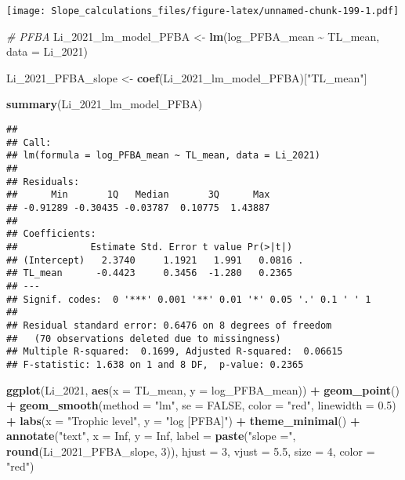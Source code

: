 \documentclass[
]{article}
\newenvironment{Shaded}{\begin{snugshade}}{\end{snugshade}}
\newcommand{\AttributeTok}[1]{\textcolor[rgb]{0.13,0.29,0.53}{#1}}
\newcommand{\CommentTok}[1]{\textcolor[rgb]{0.56,0.35,0.01}{\textit{#1}}}
\newcommand{\ConstantTok}[1]{\textcolor[rgb]{0.56,0.35,0.01}{#1}}
\newcommand{\DecValTok}[1]{\textcolor[rgb]{0.00,0.00,0.81}{#1}}
\newcommand{\FloatTok}[1]{\textcolor[rgb]{0.00,0.00,0.81}{#1}}
\newcommand{\FunctionTok}[1]{\textcolor[rgb]{0.13,0.29,0.53}{\textbf{#1}}}
\newcommand{\NormalTok}[1]{#1}
\newcommand{\OtherTok}[1]{\textcolor[rgb]{0.56,0.35,0.01}{#1}}
\newcommand{\SpecialCharTok}[1]{\textcolor[rgb]{0.81,0.36,0.00}{\textbf{#1}}}
\newcommand{\StringTok}[1]{\textcolor[rgb]{0.31,0.60,0.02}{#1}}
\begin{document}
\texttt{[image: Slope\_calculations\_files/figure-latex/unnamed-chunk-199-1.pdf]}

\begin{Shaded}
\begin{Highlighting}[]
\CommentTok{\# PFBA}
\NormalTok{Li\_2021\_lm\_model\_PFBA }\OtherTok{\textless{}{-}} \FunctionTok{lm}\NormalTok{(log\_PFBA\_mean }\SpecialCharTok{\textasciitilde{}}\NormalTok{ TL\_mean,}
                                    \AttributeTok{data =}\NormalTok{ Li\_2021)}

\NormalTok{Li\_2021\_PFBA\_slope }\OtherTok{\textless{}{-}} \FunctionTok{coef}\NormalTok{(Li\_2021\_lm\_model\_PFBA)[}\StringTok{"TL\_mean"}\NormalTok{]}

\FunctionTok{summary}\NormalTok{(Li\_2021\_lm\_model\_PFBA)}
\end{Highlighting}
\end{Shaded}

\begin{verbatim}
## 
## Call:
## lm(formula = log_PFBA_mean ~ TL_mean, data = Li_2021)
## 
## Residuals:
##      Min       1Q   Median       3Q      Max 
## -0.91289 -0.30435 -0.03787  0.10775  1.43887 
## 
## Coefficients:
##             Estimate Std. Error t value Pr(>|t|)  
## (Intercept)   2.3740     1.1921   1.991   0.0816 .
## TL_mean      -0.4423     0.3456  -1.280   0.2365  
## ---
## Signif. codes:  0 '***' 0.001 '**' 0.01 '*' 0.05 '.' 0.1 ' ' 1
## 
## Residual standard error: 0.6476 on 8 degrees of freedom
##   (70 observations deleted due to missingness)
## Multiple R-squared:  0.1699, Adjusted R-squared:  0.06615 
## F-statistic: 1.638 on 1 and 8 DF,  p-value: 0.2365
\end{verbatim}

\begin{Shaded}
\begin{Highlighting}[]
\FunctionTok{ggplot}\NormalTok{(Li\_2021, }\FunctionTok{aes}\NormalTok{(}\AttributeTok{x =}\NormalTok{ TL\_mean, }\AttributeTok{y =}\NormalTok{ log\_PFBA\_mean)) }\SpecialCharTok{+}
  \FunctionTok{geom\_point}\NormalTok{() }\SpecialCharTok{+}
  \FunctionTok{geom\_smooth}\NormalTok{(}\AttributeTok{method =} \StringTok{"lm"}\NormalTok{, }\AttributeTok{se =} \ConstantTok{FALSE}\NormalTok{, }\AttributeTok{color =} \StringTok{"red"}\NormalTok{, }\AttributeTok{linewidth =} \FloatTok{0.5}\NormalTok{) }\SpecialCharTok{+}
  \FunctionTok{labs}\NormalTok{(}\AttributeTok{x =} \StringTok{"Trophic level"}\NormalTok{,}
       \AttributeTok{y =} \StringTok{"log [PFBA]"}\NormalTok{) }\SpecialCharTok{+}
  \FunctionTok{theme\_minimal}\NormalTok{() }\SpecialCharTok{+}
  \FunctionTok{annotate}\NormalTok{(}\StringTok{"text"}\NormalTok{, }\AttributeTok{x =} \ConstantTok{Inf}\NormalTok{, }\AttributeTok{y =} \ConstantTok{Inf}\NormalTok{, }\AttributeTok{label =} \FunctionTok{paste}\NormalTok{(}\StringTok{"slope ="}\NormalTok{, }\FunctionTok{round}\NormalTok{(Li\_2021\_PFBA\_slope, }\DecValTok{3}\NormalTok{)), }
           \AttributeTok{hjust =} \DecValTok{3}\NormalTok{, }\AttributeTok{vjust =} \FloatTok{5.5}\NormalTok{, }\AttributeTok{size =} \DecValTok{4}\NormalTok{, }\AttributeTok{color =} \StringTok{"red"}\NormalTok{)}
\end{Highlighting}
\end{Shaded}
\end{document}
